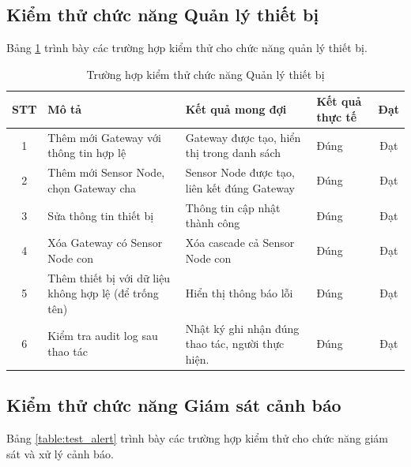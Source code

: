\documentclass[../DoAn.tex]{subfiles}
\begin{document}
\subsection{Kiểm thử chức năng Quản lý thiết bị}
\label{subsection:4.4.2}

Bảng \ref{table:test_device} trình bày các trường hợp kiểm thử cho chức năng quản lý thiết bị.

\begin{table}[H]
\centering
\caption{Trường hợp kiểm thử chức năng Quản lý thiết bị}
\label{table:test_device}
\small
\begin{tabularx}{\textwidth}{|c|X|X|X|c|}
\hline
\textbf{STT} & \textbf{Mô tả} & \textbf{Kết quả mong đợi} & \textbf{Kết quả thực tế} & \textbf{Đạt} \\
\hline
1 & Thêm mới Gateway với thông tin hợp lệ & Gateway được tạo, hiển thị trong danh sách & Đúng & Đạt \\
\hline
2 & Thêm mới Sensor Node, chọn Gateway cha & Sensor Node được tạo, liên kết đúng Gateway & Đúng & Đạt \\
\hline
3 & Sửa thông tin thiết bị & Thông tin cập nhật thành công & Đúng & Đạt \\
\hline
4 & Xóa Gateway có Sensor Node con & Xóa cascade cả Sensor Node con & Đúng & Đạt \\
\hline
5 & Thêm thiết bị với dữ liệu không hợp lệ (để trống tên) & Hiển thị thông báo lỗi & Đúng & Đạt \\
\hline
6 & Kiểm tra audit log sau thao tác & Nhật ký ghi nhận đúng thao tác, người thực hiện. & Đúng & Đạt \\
\hline
\end{tabularx}
\end{table}

\subsection{Kiểm thử chức năng Giám sát cảnh báo}
\label{subsection:4.4.3}

Bảng \ref{table:test_alert} trình bày các trường hợp kiểm thử cho chức năng giám sát và xử lý cảnh báo.
\end{document}
